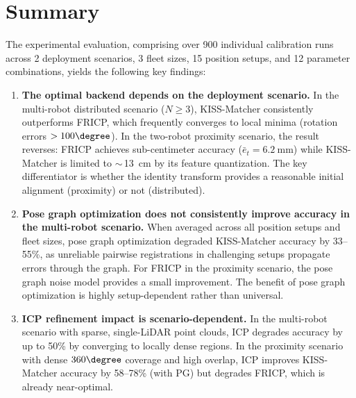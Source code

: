 \section{Summary}
\label{sec:evaluation_summary}

The experimental evaluation, comprising over 900 individual
calibration runs across 2 deployment scenarios, 3 fleet sizes,
15 position setups, and 12 parameter combinations, yields the
following key findings:

\begin{enumerate}
    \item \textbf{The optimal backend depends on the deployment
          scenario.}
          In the multi-robot distributed scenario ($N \geq 3$),
          KISS-Matcher consistently outperforms FRICP, which frequently
          converges to local minima (rotation errors $> 100\degree$).
          In the two-robot proximity scenario, the result reverses:
          FRICP achieves sub-centimeter accuracy
          ($\bar{e}_t = \SI{6.2}{\milli\metre}$) while KISS-Matcher
          is limited to $\sim$\,\SI{13}{\centi\metre} by its
          feature quantization.
          The key differentiator is whether the identity transform
          provides a reasonable initial alignment (proximity) or not
          (distributed).

    \item \textbf{Pose graph optimization does not consistently improve
          accuracy in the multi-robot scenario.}
          When averaged across all position setups and fleet sizes,
          pose graph optimization degraded KISS-Matcher accuracy by
          33--55\%, as unreliable pairwise registrations in challenging
          setups propagate errors through the graph.
          For FRICP in the proximity scenario, the pose graph noise
          model provides a small improvement.
          The benefit of pose graph optimization is highly
          setup-dependent rather than universal.

    \item \textbf{ICP refinement impact is scenario-dependent.}
          In the multi-robot scenario with sparse, single-LiDAR point
          clouds, ICP degrades accuracy by up to 50\% by converging
          to locally dense regions.
          In the proximity scenario with dense $360\degree$ coverage
          and high overlap, ICP improves KISS-Matcher accuracy by
          58--78\% (with PG) but degrades FRICP, which is already
          near-optimal.


\end{enumerate}
